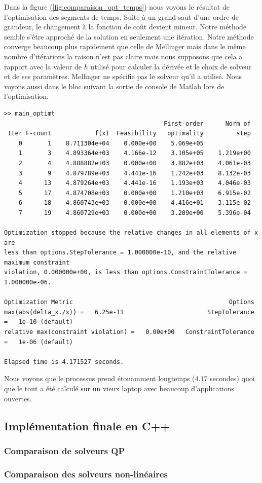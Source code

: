 Dans la figure (\ref{fig:comparaison_opt_temps}) nous voyons le résultat de l'optimisation des segments de temps. Suite à un grand saut d'une ordre de grandeur, le changement à la fonction de coût devient mineur. 
Notre méthode semble s'être approché de la solution en seulement une itération.
Notre méthode converge beaucoup plus rapidement que celle de Mellinger mais dans le même nombre d'itérations la raison n'est pas claire mais nous supposons que cela a rapport avec la valeur de $h$ utilisé pour calculer la dérivée et le choix de solveur et de ses paramètres. Mellinger ne spécifie pas le solveur qu'il a utilisé. Nous voyons aussi dans le bloc suivant la sortie de console de Matlab lors de l'optimisation.

\begin{verbatim}
>> main_optimt
                                            First-order      Norm of
 Iter F-count            f(x)  Feasibility   optimality         step
    0       1    8.711304e+04    0.000e+00    5.069e+05
    1       3    4.893364e+03    4.166e-12    3.105e+05    1.219e+00
    2       4    4.888882e+03    0.000e+00    3.882e+03    4.061e-03
    3       9    4.879789e+03    4.441e-16    1.242e+03    8.132e-03
    4      13    4.879264e+03    4.441e-16    1.193e+03    4.046e-03
    5      17    4.874708e+03    0.000e+00    1.210e+03    6.915e-02
    6      18    4.860743e+03    0.000e+00    4.416e+01    3.115e-02
    7      19    4.860729e+03    0.000e+00    3.209e+00    5.396e-04

Optimization stopped because the relative changes in all elements of x are
less than options.StepTolerance = 1.000000e-10, and the relative maximum constraint
violation, 0.000000e+00, is less than options.ConstraintTolerance = 1.000000e-06.

Optimization Metric                                           Options
max(abs(delta_x./x)) =   6.25e-11                       StepTolerance =   1e-10 (default)
relative max(constraint violation) =   0.00e+00   ConstraintTolerance =   1e-06 (default)

Elapsed time is 4.171527 seconds.
\end{verbatim}

Nous voyons que le processus prend étonamment longtemps ($4.17$ secondes) quoi que le tout a été calculé sur un vieux laptop avec beaucoup d'applications ouvertes.

\subsection{Implémentation finale en C++}

\subsubsection{Comparaison de solveurs QP}

\subsubsection{Comparaison des solveurs non-linéaires}